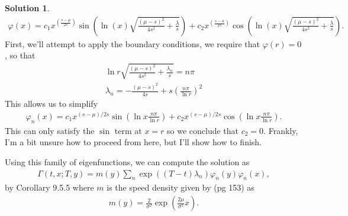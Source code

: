 \documentclass[12pt]{article}
\renewcommand{\phi}{\varphi}
\theoremstyle{definition}
\newtheorem{sol}{Solution}
\theoremstyle{remark}
\begin{document}
\begin{sol}
    \begin{align*}
        \phi(x) = c_{1} x^{ \left( \frac{s - \mu}{2s}\right) } \sin\left( \ln (x)  \sqrt{ \frac{(\mu - s)^{2}}{4s^{2}} + \frac{\lambda}{s} } \right) + c_{2}  x^{ \left( \frac{s - u}{2s}\right) } \cos\left( \ln (x)  \sqrt{ \frac{(\mu - s)^{2}}{4s^{2}} + \frac{\lambda}{s} } \right).
    \end{align*}
    First, we'll attempt to apply the boundary conditions, we require that $\phi(r) = 0$, so that 
    \begin{align*}
    \ln r  \sqrt{ \frac{(\mu - s)^{2}}{4s^{2}} + \frac{\lambda_{n}}{s} } = n \pi\\
    \lambda_{n} = -\frac{(\mu - s)^{2}}{4s}+ s\left(  \frac{n \pi}{\ln r}\right)^{2} 
    \end{align*}
    This allows us to simplify
    \begin{align*}
        \phi_{n}(x) = c_{1} x^{(s-\mu) / 2s} \sin( \ln x  \frac{n\pi}{\ln r}) + c_{2} x^{(s-\mu) / 2s} \cos(\ln x \frac{n\pi}{\ln r}).    
    \end{align*}
    This can only satisfy the $\sin$ term at $x = r$ so we conclude that $c_{2} = 0 $. Frankly, I'm a bit unsure how to proceed from here, but I'll show how to finish.

    Using this family of eigenfunctions, we can compute the solution as
    \begin{align*}
        \Gamma(t,x; T, y) = m(y) \sum_{n} \exp((T - t)\lambda_{n}) \phi_{n}(y) \phi_{n}(x),
    \end{align*}
    by Corollary 9.5.5 where $m$ is the speed density given by (pg 153) as 
    \begin{align*}
        m(y) = \frac{2}{\sigma^{2}} \exp( \frac{2\mu}{\sigma^{2}} x).
    \end{align*}
\end{sol}

\newpage
\end{document}

